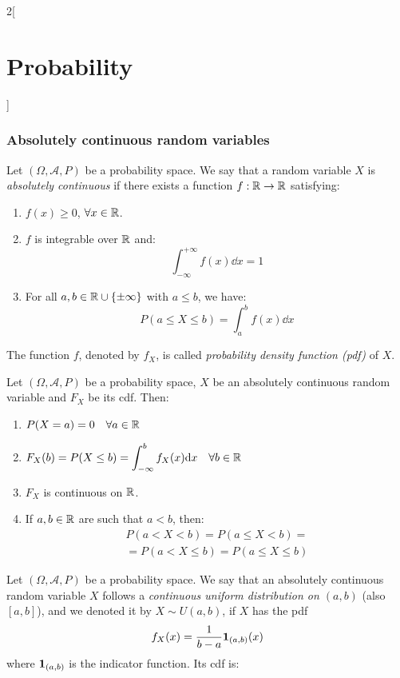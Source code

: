 \documentclass[../../../main.tex]{subfiles}
\begin{document}
\begin{multicols}{2}[\section{Probability}]
  \subsubsection*{Absolutely continuous random variables}
  \begin{definition}
    Let $(\Omega,\mathcal{A},P)$ be a probability space. We say that a random variable $X$ is \textit{absolutely continuous} if there exists a function $f:\mathbb{R}\rightarrow\mathbb{R}$ satisfying:
    \begin{enumerate}
      \item $f(x)\geq 0$, $\forall x\in\mathbb{R}$.
      \item $f$ is integrable over $\mathbb{R}$ and: $$\int_{-\infty}^{+\infty}f(x)\dd x=1$$
      \item For all $a,b\in\mathbb{R}\cup\{\pm\infty\}$ with $a\leq b$, we have: $$P(a\leq X\leq b)=\int_a^bf(x)\dd x$$
    \end{enumerate}
    The function $f$, denoted by $f_X$, is called \textit{probability density function (pdf)} of $X$.
  \end{definition}
  \begin{prop}
    Let $(\Omega,\mathcal{A},P)$ be a probability space, $X$ be an absolutely continuous random variable and $F_X$ be its cdf. Then:
    \begin{enumerate}
      \item $P(X=a)=0\quad\forall a\in \mathbb{R}$
      \item $\displaystyle F_X(b)=P(X\leq b)=\int_{-\infty}^bf_X(x)\dd x\quad\forall b\in\mathbb{R}$
      \item $F_X$ is continuous on $\mathbb{R}$.
      \item If $a,b\in\mathbb{R}$ are such that $a<b$, then:
            \begin{multline*}
              P(a<X<b)=P(a\leq X<b)=\\=P(a<X\leq b)=P(a\leq X\leq b)
            \end{multline*}
    \end{enumerate}
  \end{prop}
  \begin{definition}
    Let $(\Omega,\mathcal{A},P)$ be a probability space. We say that an absolutely continuous random variable $X$ follows a \textit{continuous uniform distribution on $(a,b)$} (also $[a,b]$), and we denoted it by $X\sim U(a,b)$, if $X$ has the pdf $$f_X(x)=\frac{1}{b-a}\boldsymbol{\mathrm{1}}_{(a,b)}(x)$$ where $\boldsymbol{\mathrm{1}}_{(a,b)}$ is the indicator function. Its cdf is:
    \begin{multline*}

\end{multline*}
\end{definition}
\end{multicols}
\end{document}
